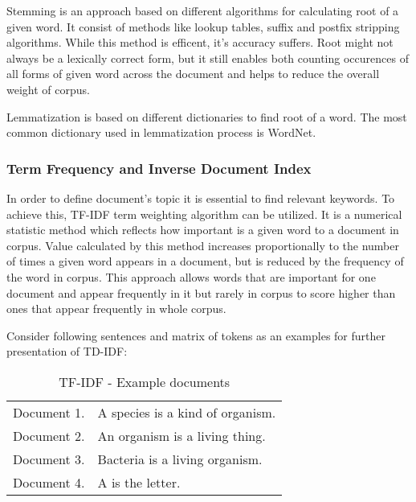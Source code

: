 Stemming is an approach based on different algorithms for calculating root of a given word. It consist of methods like lookup tables, suffix and postfix stripping algorithms. While this method is efficent, it's accuracy suffers. Root might not always be a lexically correct form, but it still enables both counting occurences of all forms of given word across the document and helps to reduce the overall weight of corpus.

Lemmatization is based on different dictionaries to find root of a word. The most common dictionary used in lemmatization process is WordNet.

\subsubsection{Term Frequency and Inverse Document Index}
In order to define document's topic it is essential to find relevant keywords. To achieve this, TF-IDF term weighting algorithm can be utilized. It is a numerical statistic method which reflects how important is a given word to a document in corpus. Value calculated by this method increases proportionally to the number of times a given word appears in a document, but is reduced by the frequency of the word in corpus. This approach allows words that are important for one document and appear frequently in it but rarely in corpus to score higher than ones that appear frequently in whole corpus.

Consider following sentences and matrix of tokens as an examples for further presentation of TD-IDF:

\begin{table}[ht]
	\centering
	\caption{TF-IDF - Example documents}
	\label{tf_idf_example_sentences}
	\begin{tabular}{@{}ll@{}}
		Document 1. & A species is a kind of organism. \\
		Document 2. & An organism is a living thing.   \\
		Document 3. & Bacteria is a living organism.   \\
		Document 4. & A is the letter.                
	\end{tabular}
\end{table}

